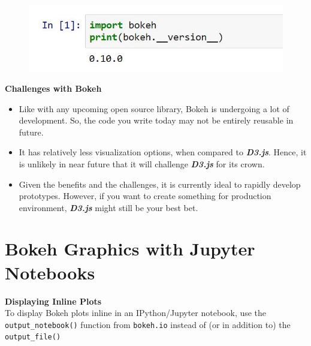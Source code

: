 \documentclass[12pt, a4paper]{report}
\begin{document}
\begin{figure}[h!]
	\centering
	\includegraphics[width=0.9\linewidth]{images/00-BOKEH-version-check}
\end{figure}
\newpage
{
	\Large
\begin{framed}
	
	\noindent \textbf{Challenges with Bokeh}
	\begin{itemize}
		\item Like with any upcoming open source library, Bokeh is undergoing a lot of development. So, the code you write today may not be entirely reusable in future.
		
		\item  It has relatively less visualization options, when compared to \textbf{\textit{D3.js}}. Hence, it is unlikely in near future that it will challenge \textbf{\textit{D3.js}} for its crown.
		\item  Given the benefits and the challenges, it is currently ideal to rapidly develop prototypes. However, if you want to create something for production environment, \textbf{\textit{D3.js}} might still be your best bet.
	\end{itemize}
\end{framed}
}
\newpage
\section*{Bokeh Graphics with Jupyter Notebooks}

\begin{framed}
\noindent \textbf{Displaying Inline Plots}\\ 
To display Bokeh plots inline in an IPython/Jupyter notebook, use the \texttt{output\_notebook()} function from \texttt{bokeh.io} instead of (or in addition to) the \texttt{output\_file()}
\end{framed}
\end{document}
